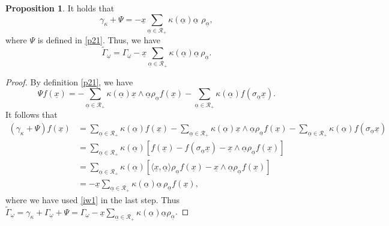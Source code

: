\documentclass{amsart}
\theoremstyle{definition}
\newtheorem{proposition}[theorem]{Proposition}
\theoremstyle{remark}
\numberwithin{equation}{section}
\begin{document}
\begin{proposition}
\label{proposition expression Gamma} It holds that
    \begin{equation*}
       \gamma_{\kappa}+\Psi= -\underline{x}\sum_{\underline{\alpha}\in \mathscr{R}_+}\kappa(\underline{\alpha})\underline{\alpha}\,\,  \rho_{\underline\alpha},
    \end{equation*}
    where $\Psi$ is defined in \eqref{p21}.
    Thus, we have
    \begin{equation*}
        \widetilde{\Gamma}_{\underline\omega}=\Gamma_{\underline\omega}-\underline{x}\sum_{\underline{\alpha}\in \mathscr{R}_+}\kappa(\underline{\alpha})\underline{\alpha}  \, \rho_{\underline\alpha}.
    \end{equation*}
    \begin{proof}
        By definition \eqref{p21}, we have
        \begin{equation*}
            \Psi f(\underline x)=-\sum_{\underline{\alpha}\in \mathscr{R}_{+}}\kappa(\underline{\alpha})\underline{x}\wedge\underline{\alpha} \rho_{\underline\alpha} f(\underline x)-\sum_{\underline{\alpha}\in \mathscr{R}_+}\kappa(\underline{\alpha})f(\sigma_{\underline{\alpha}} \underline x).
        \end{equation*}
        It follows that
        \begin{equation*}
            \begin{split}
                ( \gamma_{\kappa}+\Psi)f(\underline x)&=\sum_{\underline{\alpha}\in \mathscr{R}_+}\kappa(\underline{\alpha})f(\underline x)-\sum_{\underline{\alpha}\in \mathscr{R}_+}\kappa(\underline{\alpha})\underline x\wedge\underline{\alpha} \rho_{\underline\alpha} f(\underline x)-\sum_{\underline{\alpha}\in \mathscr{R}_+}\kappa(\underline{\alpha})f(\sigma_{\underline{\alpha}} \underline x)\\
                &=\sum_{\underline{\alpha}\in \mathscr{R}_+}\kappa(\underline{\alpha})\left[f(\underline x)-f(\sigma_{\underline{\alpha}} \underline x)-\underline x\wedge\underline{\alpha} \rho_{\underline\alpha} f(\underline x)\right]\\
                &=\sum_{\underline{\alpha}\in \mathscr{R}_+}\kappa(\underline\alpha)\left[\langle \underline x, \underline{\alpha}\rangle \rho_{\underline\alpha} f(\underline{x})-\underline x\wedge\underline{\alpha} \rho_{\underline\alpha} f(\underline x)\right]\\
                &=-\underline{x}\sum_{\underline{\alpha}\in \mathscr{R}_+}\kappa(\underline{\alpha})\underline{\alpha}\,  \rho_{\underline\alpha} f(\underline x),
            \end{split}
        \end{equation*}
        where we have used \eqref{iw1} in the last step.
        Thus $\widetilde{\Gamma}_{\underline\omega}=\gamma_\kappa+\Gamma_{\underline\omega}+\Psi=\Gamma_{\underline\omega}- \underline{x}\sum_{\underline{\alpha}\in \mathscr{R}_+}\kappa(\underline{\alpha})\underline{\alpha} \rho_{\underline\alpha}$.
    \end{proof}
\end{proposition}
\end{document}
